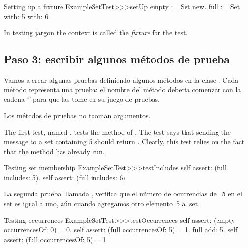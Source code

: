\documentclass[a4paper,10pt,twoside]{book}
\begin{document}


\begin{method}[setupExampleSetTest]{Setting up a fixture}
ExampleSetTest>>>setUp
	empty := Set new.
	full := Set with: 5 with: 6
\end{method}

\noindent
In testing jargon the context is called the \emph{fixture} for the
test.

\subsection{Paso 3: escribir algunos métodos de prueba}

Vamos a crear algunas pruebas definiendo algunos métodos en
la clase .  
Cada método representa una prueba: 
el nombre del método debería comenzar con la cadena `' para que \sunit
las tome en su juego de pruebas.

Los métodos de pruebas no tooman argumentos.

The first test, named , tests the
 method of .  The test says that sending the
message  to a set containing 5 should return
.  Clearly, this test relies on the fact
that the  method has already run.

\begin{method}[testIncludes]{Testing set membership}
ExampleSetTest>>>testIncludes
	self assert: (full includes: 5).
	self assert: (full includes: 6)
\end{method}

La segunda prueba, llamada , verifica que el número de ocurrencias
de ~5 en el set  es igual a uno, aún cuando agregamos otro elemento~5 al set.

\begin{method}[testOccurrences]{Testing occurrences}
ExampleSetTest>>>testOccurrences
	self assert: (empty occurrencesOf: 0) = 0.
	self assert: (full occurrencesOf: 5) = 1.
	full add: 5.
	self assert: (full occurrencesOf: 5) = 1
\end{method}
\end{document}
